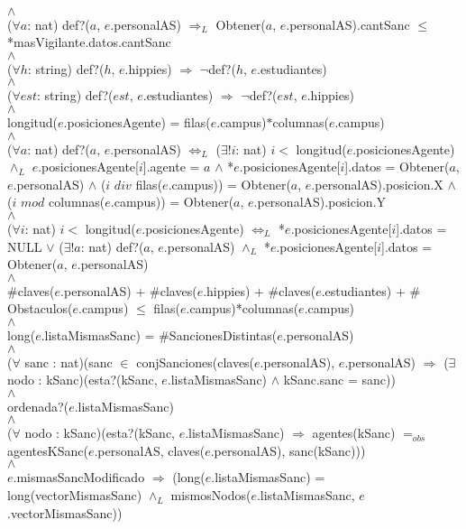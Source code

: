 {	\\
	$\land$
	\\
	($\forall a$: nat) def?($a$, $e$.personalAS) $\Rightarrow_L$ Obtener($a$, $e$.personalAS).cantSanc $\leq$ *masVigilante.datos.cantSanc 
	\\
	$\land$
	\\
	($\forall h$: string) def?($h$, $e$.hippies) $\Rightarrow$ $\neg$def?($h$, $e$.estudiantes)
	\\
	$\land$
	\\
	($\forall est$: string) def?($est$, $e$.estudiantes) $\Rightarrow$ $\neg$def?($est$, $e$.hippies)
	\\
	$\land$
	\\
	longitud($e$.posicionesAgente) = filas($e$.campus)$*$columnas($e$.campus)
	\\
	$\land$
	\\
	($\forall a$: nat) def?($a$, $e$.personalAS) $\Leftrightarrow_L$ ($\exists! i$: nat) $i <$ longitud($e$.posicionesAgente) $\land_L$ $e$.posicionesAgente[$i$].agente = $a$ $\land$ *$e$.posicionesAgente[$i$].datos = Obtener($a$, $e$.personalAS) $\land$ ($i$ $div$ filas($e$.campus)) = Obtener($a$, $e$.personalAS).posicion.X $\land$ ($i$ $mod$ columnas($e$.campus)) = Obtener($a$, $e$.personalAS).posicion.Y
	\\
	$\land$
	\\
	($\forall i$: nat) $i <$ longitud($e$.posicionesAgente) $\Leftrightarrow_L$ *$e$.posicionesAgente[$i$].datos = NULL $\lor$ ($\exists! a$: nat) def?($a$, $e$.personalAS) $\land_L$ *$e$.posicionesAgente[$i$].datos = Obtener($a$, $e$.personalAS)
	\\
	$\land$
	\\
	$\#$claves($e$.personalAS) $+$ $\#$claves($e$.hippies) $+$ $\#$claves($e$.estudiantes) $+$ $\#$Obstaculos($e$.campus) $\leq$ filas($e$.campus)*columnas($e$.campus)
	\\
	$\land$
	\\
	long($e$.listaMismasSanc) = $\#$SancionesDistintas($e$.personalAS)
	\\
	$\land$
	\\
	($\forall$ sanc : nat)(sanc $\in$ conjSanciones(claves($e$.personalAS), $e$.personalAS) $\Rightarrow$ ($\exists$ nodo : kSanc)(esta?(kSanc, $e$.listaMismasSanc) $\land$ kSanc.sanc = sanc))
	\\
	$\land$
	\\
	ordenada?($e$.listaMismasSanc)
	\\
	$\land$
	\\
	($\forall$ nodo : kSanc)(esta?(kSanc, $e$.listaMismasSanc) $\Rightarrow$ agentes(kSanc) $=_{obs}$ agentesKSanc($e$.personalAS, claves($e$.personalAS), sanc(kSanc)))
	\\
	$\land$
	\\
	$e$.mismasSancModificado $\Rightarrow$ (long($e$.listaMismasSanc) = long(vectorMismasSanc) $\land_L$ mismosNodos($e$.listaMismasSanc, $e$.vectorMismasSanc))
	

}\mbox{}

